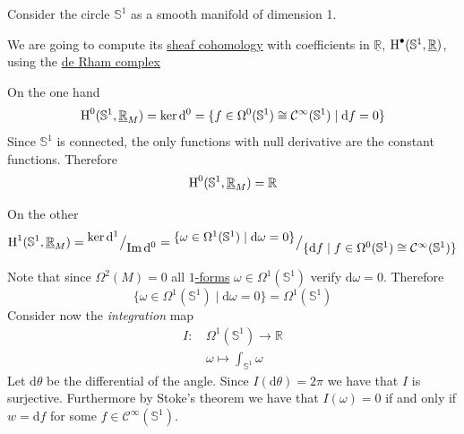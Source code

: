\documentclass[../../main]{subfiles}
\begin{document}
\begin{example}
  Consider the circle \(\mathbb{S}^{1}\) as a smooth manifold of dimension 1.

  We are going to compute its \hyperref[def:sheaf-cohomology]{sheaf cohomology} with coefficients in \(\underline{\mathbb{R}}\), \(\operatorname{H}^{\bullet}(\mathbb{S}^{1}, \underline{\mathbb{R}})\), using the \hyperref[def:de-rham-complex]{de Rham complex}
  \begin{center}
  \end{center}

  On the one hand
  \begin{equation*}
    \operatorname{H}^{0}(\mathbb{S}^{1}, \underline{\mathbb{R}}_{M}) = \ker \mathrm{d}^{0} = \{f \in \Omega^{0}(\mathbb{S}^{1}) \cong \mathcal{C}^{\infty}(\mathbb{S}^{1}) \mid \mathrm{d} f = 0\}
  \end{equation*}
  Since \(\mathbb{S}^{1}\) is connected, the only functions with null derivative are the constant functions.
  Therefore
  \begin{equation*}
    \operatorname{H}^{0}(\mathbb{S}^{1}, \underline{\mathbb{R}}_{M}) = \mathbb{R}
  \end{equation*}

  On the other
  \begin{equation*}
    \operatorname{H}^{1}(\mathbb{S}^{1}, \underline{\mathbb{R}}_{M}) = {^{\textstyle \ker \mathrm{d}^{1}}\big/_{\textstyle \operatorname*{Im} \mathrm{d}^{0}}} = {^{\textstyle \{\omega \in \Omega^{1}(\mathbb{S}^{1}) \mid \mathrm{d} \omega = 0\}}\big/_{\textstyle \{\mathrm{d} f \mid f \in \Omega^{0}(\mathbb{S}^{1}) \cong \mathcal{C}^{\infty}(\mathbb{S}^{1})\}}}
  \end{equation*}

  Note that since \(\Omega^{2}(M) = 0\) all \hyperref[def:smooth-k-form]{\(1\)-forms} \(\omega \in \Omega^{1}(\mathbb{S}^{1})\) verify \(\mathrm{d}\omega = 0\).
  Therefore
  \begin{equation*}
    \{\omega \in \Omega^{1}(\mathbb{S}^{1}) \mid \mathrm{d}\omega = 0\} = \Omega^{1}(\mathbb{S}^{1})
  \end{equation*}
  Consider now the \textit{integration} map
  \begin{align*}
    I:\,& \Omega^{1}(\mathbb{S}^{1}) \to \mathbb{R} \\
        & \omega \mapsto \int_{\mathbb{S}^{1}} \omega 
  \end{align*}
  Let \(\mathrm{d}\theta\) be the differential of the angle.
  Since \(I(\mathrm{d}\theta) = 2\pi\) we have that \(I\) is surjective.
  Furthermore by Stoke's theorem we have that \(I(\omega) = 0\) if and only if \(w = \mathrm{d}f\) for some \(f \in \mathcal{C}^{\infty}(\mathbb{S}^{1})\).


\end{example}
\end{document}
